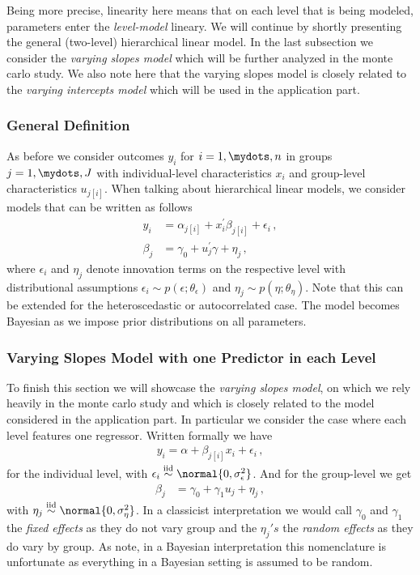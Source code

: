Being more precise, linearity here means that on each level that is being modeled, parameters enter the \emph{level-model} lineary.
We will continue by shortly presenting the general (two-level) hierarchical linear model.
In the last subsection we consider the \emph{varying slopes model} which will be further analyzed in the monte carlo study.
We also note here that the varying slopes model is closely related to the \emph{varying intercepts model} which will be used in the application part.

\subsubsection*{General Definition}
As before we consider outcomes $y_i$ for $i=1,\mydots,n$ in groups $j=1,\mydots,J$ with individual-level characteristics $x_i$ and group-level characteristics $u_{j[i]}$.
When talking about hierarchical linear models, we consider models that can be written as follows
\begin{align}
  y_i &= \alpha_{j[i]} + x_i^\prime \beta_{j[i]} + \epsilon_i \,,\\
  \beta_j &= \gamma_0 + u_j^\prime \gamma + \eta_j \,,
\end{align}
where $\epsilon_i$ and $\eta_j$ denote innovation terms on the respective level with distributional assumptions $\epsilon_i \sim p(\epsilon; \theta_\epsilon)$ and $\eta_j \sim p(\eta; \theta_\eta)$.
Note that this can be extended for the heteroscedastic or autocorrelated case.
The model becomes Bayesian as we impose prior distributions on all parameters.

\subsubsection*{Varying Slopes Model with one Predictor in each Level}
To finish this section we will showcase the \emph{varying slopes model}, on which we rely heavily in the monte carlo study and which is closely related to the model considered in the application part.
In particular we consider the case where each level features one regressor.
Written formally we have
\begin{align}
  y_i = \alpha + \beta_{j[i]} x_i + \epsilon_i \,,
\end{align}
for the individual level, with $\epsilon_i \overset{\text{iid}}{\sim} \normal{0, \sigma_\epsilon^2}$.
And for the group-level we get
\begin{align}
  \beta_j &= \gamma_0 + \gamma_1 u_j + \eta_j \,,
\end{align}
with $\eta_j \overset{\text{iid}}{\sim} \normal{0, \sigma_\eta^2}$.
In a classicist interpretation we would call $\gamma_0$ and  $\gamma_1$ the \emph{fixed effects} as they do not vary group and the $\eta_j's$ the \emph{random effects} as they do vary by group.
As \citet{GelmanHill2007} note, in a Bayesian interpretation this nomenclature is unfortunate as everything in a Bayesian setting is assumed to be random.

